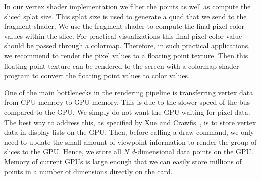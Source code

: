 In our vertex shader implementation we filter the points as well as compute
the sliced splat size.  This splat size is used to generate a quad that we
send to the fragment shader.  We use the fragment shader to compute the 
final pixel color values within the slice.
For practical visualizations this final pixel color value should be passed
through a colormap.  Therefore, in such practical applications, we recommend
to render the pixel values to a floating point texture. Then this floating
point texture can be rendered to the screen with a colormap shader program
to convert the floating point values to color values.

One of the main bottlenecks in the rendering pipeline is transferring
vertex data from CPU memory to GPU memory.  This is due to the slower
speed of the bus compared to the GPU. We simply do not want the GPU waiting
for pixel data.  The best way to address this, as specified by Xue and
Crawfis~\cite{Xue:2003}, is to store vertex data in display lists on the
GPU.  Then, before calling a draw command, we only need to update the 
small amount of viewpoint information to
render the group of slices to the GPU. Hence, we store all $N$ $d$-dimensional
data points on the GPU. Memory of current GPUs is large enough that we can easily 
store millions of points in a number of dimensions directly on the card.

